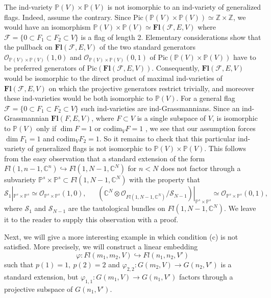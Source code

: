 \documentclass[12pt]{amsart}
\newcommand\codim{\text{codim}}
\renewcommand{\phi}{\varphi}
\theoremstyle{definition}
\begin{document}
The ind-variety $\mathbb{P}(V)\times \mathbb{P}(V)$ is not isomorphic 
to an ind-variety of generalized flags. Indeed, assume the contrary. 
Since $\mathrm{Pic}(\mathbb{P}(V)\times\mathbb{P}
(V))\simeq\mathbb{Z}\times\mathbb{Z}$, we would have an isomorphism
$\mathbb{P}(V)\times\mathbb{P}(V)\simeq\mathbf{Fl}(\mathcal{F},E,V)$
where $\mathcal{F}=\{0\subset F_1\subset F_2\subset V\}$ is a flag of
length 2. Elementary considerations show that the pullback on
$\mathbf{Fl}(\mathcal{F},E,V)$ of the two standard generators
$\mathcal{O}_{\mathbb{P}(V)\times\mathbb{P}(V)}(1,0)$ and
$\mathcal{O}_{\mathbb{P}(V)\times\mathbb{P}(V)}(0,1)$ of $\mathrm{Pic
}(\mathbb{P}(V)\times\mathbb{P}(V))$ have to be preferred generators 
of $\mathrm{Pic}(\mathbf{Fl}(\mathcal{F},E,V))$. Consequently,
$\mathbf{Fl}(\mathcal{F},E,V)$ would be isomorphic to the direct 
product of maximal ind-varieties of $\mathbf{Fl}(\mathcal{F},E,V)$ on 
which the projective generators restrict trivially, and moreover 
these ind-varieties would be both isomorphic to $\mathbb{P}(V)$. For a 
general flag $\mathcal{F}=\{0\subset F_1\subset F_2\subset V\}$ such 
ind-varieties
are ind-Grassmannians. Since an ind-Grassmannian $\mathbf{Fl}(F,E,
V)$, where $F\subset V$ is a single subspace of $V$, is isomorphic to
$\mathbb{P}(V)$ only if $\dim F=1$ or $\codim_VF=1$ \cite[Thm. 2]{
PT}, we see that our assumption forces $\dim F_1=1$ and $\codim_VF_2
=1$. So it remains to check that this particular ind-variety of
generalized flags is not isomorphic to $\mathbb{P}(V)\times\mathbb{P}
(V)$. This follows from the easy observation that a standard extension
of the form $Fl(1,n-1,\mathbb{C}^n)\hookrightarrow Fl(1,N-1,
\mathbb{C}^N)$ for $n<N$ does not factor through a subvariety 
$\mathbb{P}^s\times\mathbb{P}^s\subset Fl(1,N-1,\mathbb{C}^N)$ with 
the property that $$\mathcal{S}_1|_{\mathbb{P}^s\times\mathbb{P}^s}
\simeq\mathcal{O}_{\mathbb{P}^s\times\mathbb{P}^s}(1,0), \ \ \ \ \ \ \
(\mathbb{C}
^N\otimes\mathcal{O}_{Fl(1,N-1,\mathbb{C}^N)}/\mathcal{S}_{N-1})|_{
\mathbb{P}^s\times\mathbb{P}^s}\simeq
\mathcal{O}_{\mathbb{P}^s\times\mathbb{P}^s}(0,1),$$ where 
$\mathcal{S}_1$ and $\mathcal{S}_{N-1}$ are the tautological bundles 
on $Fl(1,N-1,\mathbb{C}^N)$. We leave it to the reader to supply this 
observation with a proof. 

Next, we will give a more interesting example in which 
condition (c) is not satisfied. More precisely, we will 
construct a linear embedding $$\phi: Fl(m_1,m_2,V)
\hookrightarrow Fl(n_1,n_2,V')$$ such 
that $p(1)=1,\ p(2)=2$ and $\phi_{2,2}:G(m_2,V)\to  G(n_2,V')$ is 
a standard extension, but $\phi_{1,1}:G(m_1,V)\to G(n_1,V')$ 
factors through a projective subspace of $G(n_1,V')$.
\end{document}
